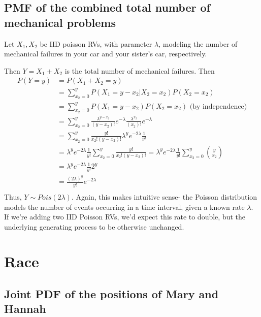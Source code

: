 \documentclass[paper=a4, fontsize=11pt]{scrartcl} %
\numberwithin{equation}{section} %
\numberwithin{figure}{section} %
\numberwithin{table}{section} %
\begin{document}
\subsection{PMF of the combined total number of mechanical problems}

Let $X_1, X_2$ be IID poisson RVs, with parameter $\lambda$, modeling the number of mechanical failures in your car and your sister's car, respectively. 

Then $Y = X_1 + X_2$ is the total number of mechanical failures. Then
\begin{align*}
P(Y = y) &= P(X_1 + X_2 = y)\\
   &= \sum_{x_2 = 0}^y P(X_1 = y - x_2 | X_2 = x_2) P(X_2 = x_2)\\
   &=  \sum_{x_2 = 0}^y P(X_1 = y - x_2) P(X_2 = x_2) \textrm{      (by independence)}\\
   &= \sum_{x_2 = 0}^y \frac{\lambda^{y-x_2}}{(y-x_2)!}e^{-\lambda}\frac{\lambda^{x_2}}{(x_2)!}e^{-\lambda}\\
   &=  \sum_{x_2 = 0}^y \frac{y!}{x_2!(y-x_2)!}\lambda^y e^{-2\lambda}\frac{1}{y!}\\
   &=  \lambda^y e^{-2\lambda}\frac{1}{y!}\sum_{x_2 = 0}^y \frac{y!}{x_2!(y-x_2)!} =  \lambda^y e^{-2\lambda}\frac{1}{y!}\sum_{x_2 = 0}^y {{y}\choose{x_2}}\\
   &=  \lambda^y e^{-2\lambda}\frac{1}{y!} 2^y\\
   &=  \frac{(2\lambda)^y}{y!} e^{-2\lambda}\\
\end{align*}
Thus, $Y \sim Pois(2\lambda)$. Again, this makes intuitive sense- the Poisson distribution models the number of events occurring in a time interval, given a known rate $\lambda$. If we're adding two IID Poisson RVs, we'd expect this rate to double, but the underlying generating process to be otherwise unchanged.


\section{Race}

\subsection{Joint PDF of the positions of Mary and Hannah}
\end{document}
